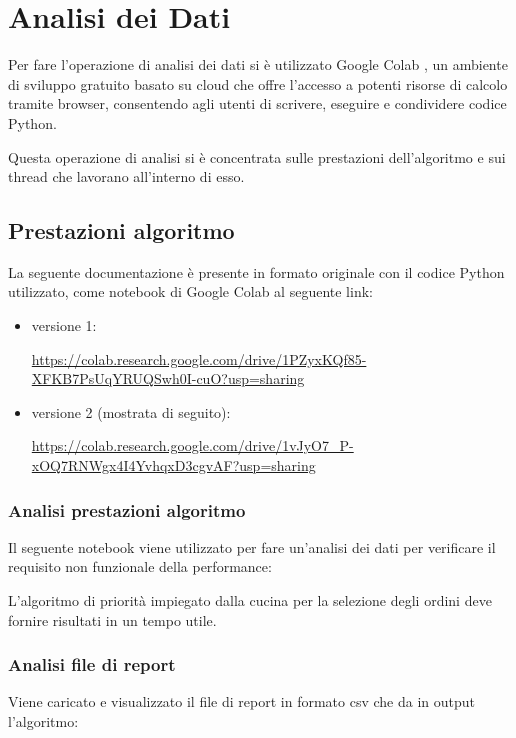 \section{Analisi dei Dati}

Per fare l'operazione di analisi dei dati si è utilizzato Google Colab \cite{googlecolab}, un ambiente di sviluppo gratuito basato su cloud che offre l'accesso a potenti risorse di calcolo tramite browser, consentendo agli utenti di scrivere, eseguire e condividere codice Python.

Questa operazione di analisi si è concentrata sulle prestazioni dell'algoritmo e sui thread che lavorano all'interno di esso.

\subsection{Prestazioni algoritmo}
La seguente documentazione è presente in formato originale con il codice Python utilizzato, come notebook di Google Colab al seguente link:

\begin{itemize}
	\item versione 1:
	
	 {\footnotesize \href{https://colab.research.google.com/drive/1PZyxKQf85-XFKB7PsUqYRUQSwh0I-cuO?usp=sharing}{https://colab.research.google.com/drive/1PZyxKQf85-XFKB7PsUqYRUQSwh0I-cuO?usp=sharing}}
	 
	 \item versione 2 (mostrata di seguito):
	 
	 {\footnotesize \href{https://colab.research.google.com/drive/1vJyO7_P-xOQ7RNWgx4I4YvhqxD3cgvAF?usp=sharing}{https://colab.research.google.com/drive/1vJyO7\_P-xOQ7RNWgx4I4YvhqxD3cgvAF?usp=sharing}}

\end{itemize}


\subsubsection{Analisi prestazioni algoritmo}
Il seguente notebook viene utilizzato per fare un'analisi dei dati per verificare il requisito non funzionale della performance:

L’algoritmo di priorità impiegato dalla cucina per la selezione degli ordini deve fornire risultati in un tempo utile.

\subsubsection{Analisi file di report}
Viene caricato e visualizzato il file di report in formato csv che da in output l'algoritmo:

